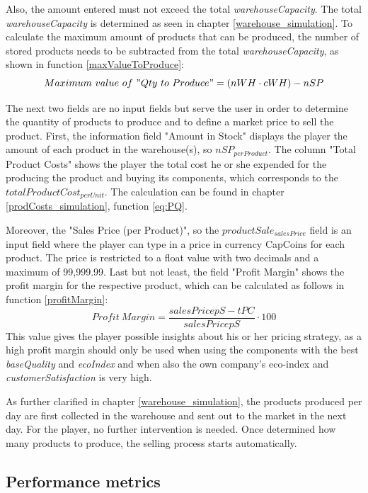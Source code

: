 Also, the amount entered must not exceed the total \textit{warehouseCapacity}. The total \textit{warehouseCapacity} is determined as seen in chapter \ref{warehouse_simulation}. To calculate the maximum amount of products that can be produced, the number of stored products needs to be subtracted from the total \textit{warehouseCapacity}, as shown in function \ref{maxValueToProduce}:
\begin{equation}
\label{maxValueToProduce}
    Maximum~value~of~"Qty~to~Produce" = (nWH \cdot cWH) - nSP
\end{equation}

The next two fields are no input fields but serve the user in order to determine the quantity of products to produce and to define a market price to sell the product. First, the information field "Amount in Stock" displays the player the amount of each product in the warehouse(s), so $nSP_{per Product}$. The column "Total Product Costs" shows the player the total cost he or she expended for the producing the product and buying its components, which corresponds to the 
$totalProductCost_{perUnit}$. The calculation can be found in chapter \ref{prodCosts_simulation}, function \ref{eq:PQ}.

Moreover, the "Sales Price (per Product)", so the $productSale_{salesPrice}$ field is an input field where the player can type in a price in currency CapCoins for each product. The price is restricted to a float value with two decimals and a maximum of 99,999.99.
Last but not least, the field "Profit Margin" shows the profit margin for the respective product, which can be calculated as follows in function \ref{profitMargin}:
\begin{equation}
\label{profitMargin}
    Profit~Margin = \frac{salesPrice{pS} - tPC}{salesPrice{pS}} \cdot 100
\end{equation}
This value gives the player possible insights about his or her pricing strategy, as a high profit margin should only be used when using the components with the best \textit{baseQuality} and \textit{ecoIndex} and when also the own company's eco-index and \textit{customerSatisfaction} is very high.

As further clarified in chapter \ref{warehouse_simulation}, the products produced per day are first collected in the warehouse and sent out to the market in the next day. For the player, no further intervention is needed. Once determined how many products to produce, the selling process starts automatically.

\subsection{Performance metrics}
\label{sub:PM}

